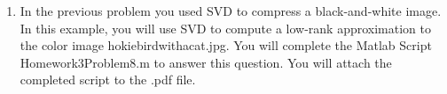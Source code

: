 \documentclass{article}
\theoremstyle{definition}
\newtheorem*{answer}{Answer}
\begin{document}
\begin{enumerate}[leftmargin=\labelsep]
\begin{enumerate}
\begin{answer}
\begin{figure}[H]
\begin{subfigure}{0.225\textwidth}
					            \caption{\(k=50\)}\label{fig:Thumb50}
				            \end{subfigure}
				            \caption{Original fingerprint image compared to its optimal rank-\(k \) approximations.}\label{fig:Thums}
			            \end{figure}
			            The code for this question is given below:
			            \begin{mdframed}[backgroundcolor=lightgray]
			            \end{mdframed}
		            \end{answer}
	      \end{enumerate}

	\item In the previous problem you used SVD to compress a black-and-white image. In this example, you will use SVD to compute a low-rank approximation to the color image hokiebirdwithacat.jpg. You will complete the Matlab Script Homework3Problem8.m to answer this question. You will attach the completed script to the .pdf file.


\end{enumerate}
\end{document}

